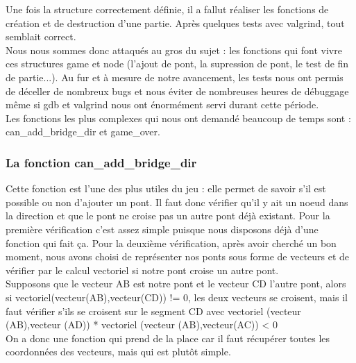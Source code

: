 \documentclass[12pt]{report}
\begin{document}
\textnormal{Une fois la structure correctement définie, il a fallut réaliser les fonctions de création et de destruction d'une partie. Après quelques tests avec valgrind, tout semblait correct.\\ Nous nous sommes donc attaqués au gros du sujet : les fonctions qui font vivre ces structures game et node (l'ajout de pont, la supression de pont, le test de fin de partie...). Au fur et à mesure de notre avancement, les tests nous ont permis de déceller de nombreux bugs et nous éviter de nombreuses heures de débuggage même si gdb et valgrind nous ont énormément servi durant cette période.\\ Les fonctions les plus complexes qui nous ont demandé beaucoup de temps sont : can\_add\_bridge\_dir et game\_over.}

\subsubsection{La fonction can\_add\_bridge\_dir}
\textnormal{Cette fonction est l'une des plus utiles du jeu : elle permet de savoir s'il est possible ou non d'ajouter un pont. Il faut donc vérifier qu'il y ait un noeud dans la direction et que le pont ne croise pas un autre pont déjà existant. Pour la première vérification c'est assez simple puisque nous disposons déjà d'une fonction qui fait ça. Pour la deuxième vérification, après avoir cherché un bon moment, nous avons choisi de représenter nos ponts sous forme de vecteurs et de vérifier par le calcul vectoriel si notre pont croise un autre pont. \\ Supposons que le vecteur AB est notre pont et le vecteur CD l'autre pont, alors si vectoriel(vecteur(AB),vecteur(CD)) != 0, les deux vecteurs se croisent, mais il faut vérifier s'ils se croisent sur le segment CD avec vectoriel (vecteur (AB),vecteur (AD)) * vectoriel (vecteur (AB),vecteur(AC)) < 0\\On a donc une fonction qui prend de la place car il faut récupérer toutes les coordonnées des vecteurs, mais qui est plutôt simple.}
\end{document}
